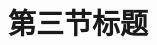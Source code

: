 \documentclass[../../main.tex]{subfiles}%
\begin{document}
\section{第三节标题}

\lipsum[1-3]%
\end{document}
